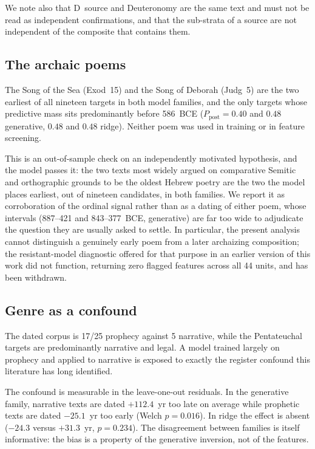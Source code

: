 We note also that D~source and Deuteronomy are the same text and must not
be read as independent confirmations, and that the sub-strata of a source
are not independent of the composite that contains them.

\subsection*{The archaic poems}

The Song of the Sea (Exod~15) and the Song of Deborah (Judg~5) are the two
earliest of all nineteen targets in both model families, and the only
targets whose predictive mass sits predominantly before 586~BCE
($P_{\mathrm{post}} = 0.40$ and $0.48$ generative, $0.48$ and $0.48$
ridge).  Neither poem was used in training or in feature screening.

This is an out-of-sample check on an independently motivated hypothesis,
and the model passes it: the two texts most widely argued on comparative
Semitic and orthographic grounds to be the oldest Hebrew poetry are the two
the model places earliest, out of nineteen candidates, in both families.
We report it as corroboration of the ordinal signal rather than as a dating
of either poem, whose intervals (887--421 and 843--377~BCE, generative)
are far too wide to adjudicate the question they are usually asked to
settle.  In particular, the present analysis cannot distinguish a genuinely
early poem from a later archaizing composition; the resistant-model
diagnostic offered for that purpose in an earlier version of this work did
not function, returning zero flagged features across all 44 units, and has
been withdrawn.

\subsection*{Genre as a confound}

The dated corpus is 17/25 prophecy against 5 narrative, while the
Pentateuchal targets are predominantly narrative and legal.  A model
trained largely on prophecy and applied to narrative is exposed to exactly
the register confound this literature has long identified.

The confound is measurable in the leave-one-out residuals.  In the
generative family, narrative texts are dated $+112.4$~yr too late on
average while prophetic texts are dated $-25.1$~yr too early (Welch
$p = 0.016$).  In ridge the effect is absent ($-24.3$ versus $+31.3$~yr,
$p = 0.234$).  The disagreement between families is itself informative:
the bias is a property of the generative inversion, not of the features.

